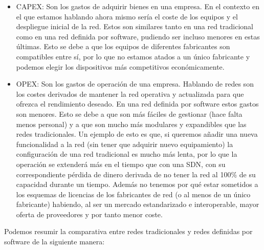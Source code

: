 \begin{itemize}
    \item CAPEX: Son los gastos de adquirir bienes en una empresa. En el contexto en el que estamos hablando ahora mismo sería el coste de los equipos y el despliegue inicial de la red. Estos son similares tanto en una red tradicional como en una red definida por software, pudiendo ser incluso menores en estas últimas. Esto se debe a que los equipos de diferentes fabricantes son compatibles entre sí, por lo que no estamos atados a un único fabricante y podemos elegir los dispositivos más competitivos económicamente.
    \item OPEX: Son los gastos de operación de una empresa. Hablando de redes son los costes derivados de mantener la red operativa y actualizada para que ofrezca el rendimiento deseado. En una red definida por software estos gastos son menores. Esto se debe a que son más fáciles de gestionar (hace falta menos personal) y a que son mucho más modulares y expandibles que las redes tradicionales. Un ejemplo de esto es que, si queremos añadir una nueva funcionalidad a la red (sin tener que adquirir nuevo equipamiento) la configuración de una red tradicional es mucho más lenta, por lo que la operación se extenderá más en el tiempo que con una SDN, con su correspondiente pérdida de dinero derivada de no tener la red al 100\% de su capacidad durante un tiempo. Además no tenemos por qué estar sometidos a los esquemas de licencias de los fabricantes de red (o al menos de un único fabricante) habiendo, al ser un mercado estandarizado e interoperable, mayor oferta de proveedores y por tanto menor coste.
\end{itemize}

Podemos resumir la comparativa entre redes tradicionales y redes definidas por software de la siguiente manera:

